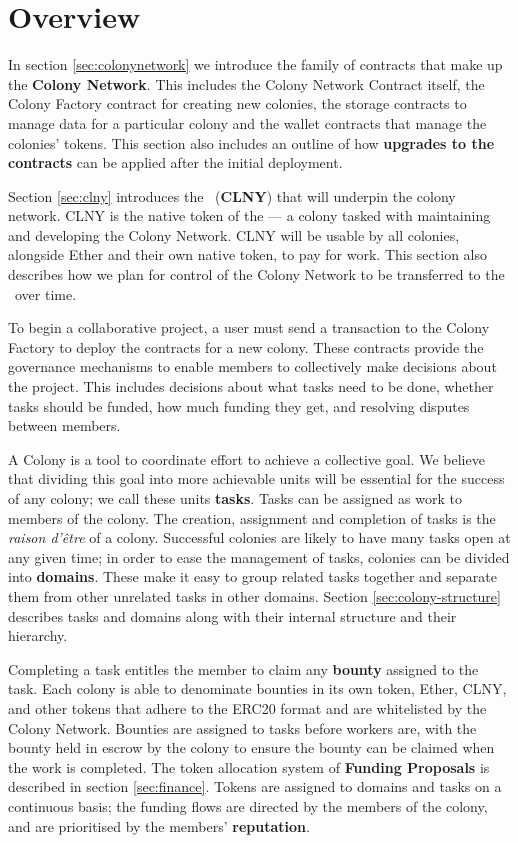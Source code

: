 \section{Overview}

In section \ref{sec:colonynetwork} we introduce the family of contracts that make up the \textbf{Colony Network}. This includes the Colony Network Contract itself, the Colony Factory contract for creating new colonies, the storage contracts to manage data for a particular colony and the wallet contracts that manage the colonies' tokens. This section also includes an outline of how \textbf{upgrades to the contracts} can be applied after the initial deployment.

Section \ref{sec:clny} introduces the \rcts\ (\textbf{CLNY}) that will underpin the colony network. CLNY is the native token of the \textbf{\rc} --- a colony tasked with maintaining and developing the Colony Network. CLNY will be usable by all colonies, alongside Ether and their own native token, to pay for work. This section also describes how we plan for control of the Colony Network to be transferred to the \rc\ over time.

To begin a collaborative project, a user must send a transaction to the Colony Factory to deploy the contracts for a new colony. These contracts provide the governance mechanisms to enable members to collectively make decisions about the project. This includes decisions about what tasks need to be done, whether tasks should be funded, how much funding they get, and resolving disputes between members.

A Colony is a tool to coordinate effort to achieve a collective goal. We believe that dividing this goal into more achievable units will be essential for the success of any colony; we call these units \textbf{tasks}. Tasks can be assigned as work to members of the colony. The creation, assignment and completion of tasks is the \emph{raison d'être} of a colony. Successful colonies are likely to have many tasks open at any given time; in order to ease the management of tasks, colonies can be divided into \textbf{domains}. These make it easy to group related tasks together and separate them from other unrelated tasks in other domains. Section \ref{sec:colony-structure} describes tasks and domains along with their internal structure and their hierarchy.

Completing a task entitles the member to claim any \textbf{bounty} assigned to the task. Each colony is able to denominate bounties in its own token, Ether, CLNY, and other tokens that adhere to the ERC20 format \cite{erc20} and are whitelisted by the Colony Network. Bounties are assigned to tasks before workers are, with the bounty held in escrow by the colony to ensure the bounty can be claimed when the work is completed. The token allocation system of \textbf{Funding Proposals} is described in section \ref{sec:finance}. Tokens are assigned to domains and tasks on a continuous basis; the funding flows are directed by the members of the colony, and are prioritised by the members' \textbf{reputation}. 

